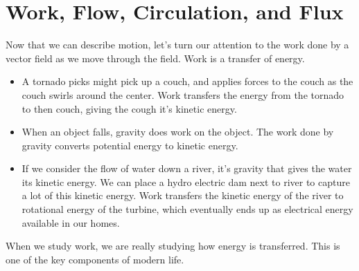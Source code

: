 

\section{Work, Flow, Circulation, and Flux}

Now that we can describe motion, let's turn our attention to the work done by a vector field as we move through the field. Work is a transfer of energy. 
\begin{itemize}
 \item A tornado picks might pick up a couch, and applies forces to the couch as the couch swirls around the center. Work transfers the energy from the tornado to then couch, giving the cough it's kinetic energy. 
 \item When an object falls, gravity does work on the object. The work done by gravity converts potential energy to kinetic energy. 
 \item If we consider the flow of water down a river, it's gravity that gives the water its kinetic energy. We can place a hydro electric dam next to river to capture a lot of this kinetic energy.  Work transfers the kinetic energy of the river to rotational energy of the turbine, which eventually ends up as electrical energy available in our homes.  
\end{itemize}
When we study work, we are really studying how energy is transferred. This is one of the key components of modern life.

